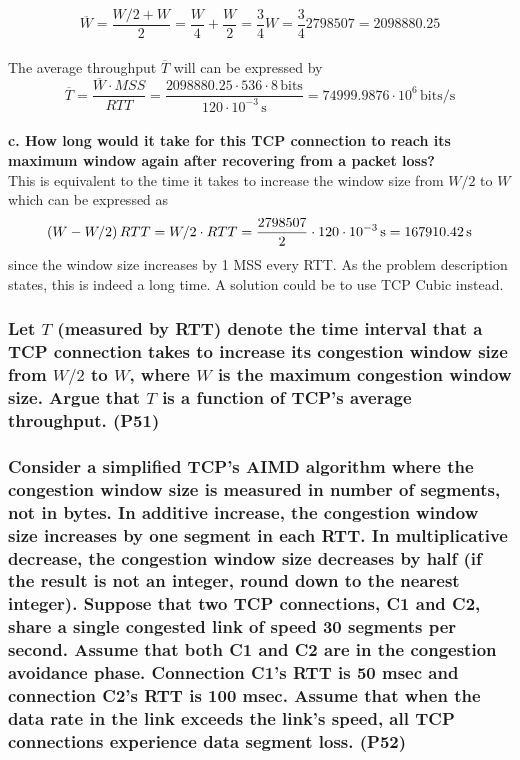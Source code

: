 \begin{equation*}
    \overline{W} = \frac{W/2 + W}{2} = \frac{W}{4} + \frac{W}{2} = \frac{3}{4} W = \frac{3}{4} 2798507 = 2098880.25
\end{equation*}
\\
The average throughput $\overline{T}$ will can be expressed by
\begin{equation*}
    \overline{T} = \frac{\overline{W} \cdot MSS}{RTT} = \frac{2098880.25 \cdot 536 \cdot 8 \, \text{bits}}{120 \cdot 10^{-3} \, \text{s}} = 74999.9876 \cdot 10^6 \, \text{bits/s}
\end{equation*}
\\
\textbf{c. How long would it take for this TCP connection to reach its maximum window again after recovering from a packet loss?} \\
This is equivalent to the time it takes to increase the window size from $W/2$ to $W$ which can be expressed as
\begin{equation*}
    \left (W - W/2\right) RTT = W/2 \cdot RTT  = \frac{2798507}{2} \cdot 120 \cdot 10^{-3} \, \text{s} = 167910.42 \, \text{s}
\end{equation*}
since the window size increases by 1 MSS every RTT. As the problem description states, this is indeed a long time. A solution could be to use TCP Cubic instead.


\subsubsection{Let $T$ (measured by RTT) denote the time interval that a TCP connection takes to increase its congestion window size from $W/2$ to $W$, where $W$ is the maximum congestion window size. Argue that $T$ is a function of TCP's  average throughput. (P51)}


\subsubsection{Consider a simplified TCP's AIMD algorithm where the congestion window size is measured in number of segments, not in bytes. In additive increase, the congestion window size increases by one segment in each RTT. In multiplicative decrease, the congestion window size decreases by half (if the result is not an integer, round down to the nearest integer). Suppose that two TCP connections, C1 and C2, share a single congested link of speed 30 segments per second. Assume that both C1 and C2 are in the congestion avoidance phase. Connection C1's RTT is 50 msec and connection C2's RTT is 100 msec. Assume that when the data rate in the link exceeds the link's speed, all  TCP connections experience data segment loss. (P52)}

